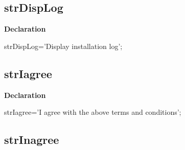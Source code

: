 \documentclass{report}
\newif\ifpdf
\begin{document}
\subsection*{strDispLog}
\fi
\label{trstrings-strDispLog}
\begin{list}{}{
\setlength{\itemindent}{0cm}
\setlength{\listparindent}{0cm}
\setlength{\leftmargin}{\evensidemargin}
\addtolength{\leftmargin}{\tmplength}
\settowidth{\labelsep}{X}
\addtolength{\leftmargin}{\labelsep}
\setlength{\labelwidth}{\tmplength}
}
\item[\textbf{Declaration}\hfill]
\ifpdf
\begin{flushleft}
\fi
\begin{ttfamily}
strDispLog='Display installation log';\end{ttfamily}

\ifpdf
\end{flushleft}
\fi

\end{list}
\ifpdf
\subsection*{\large{\textbf{strIagree}}\normalsize\hspace{1ex}\hrulefill}
\else
\subsection*{strIagree}
\fi
\label{trstrings-strIagree}
\begin{list}{}{
\setlength{\itemindent}{0cm}
\setlength{\listparindent}{0cm}
\setlength{\leftmargin}{\evensidemargin}
\addtolength{\leftmargin}{\tmplength}
\settowidth{\labelsep}{X}
\addtolength{\leftmargin}{\labelsep}
\setlength{\labelwidth}{\tmplength}
}
\item[\textbf{Declaration}\hfill]
\ifpdf
\begin{flushleft}
\fi
\begin{ttfamily}
strIagree='I agree with the above terms and conditions';\end{ttfamily}

\ifpdf
\end{flushleft}
\fi

\end{list}
\ifpdf
\subsection*{\large{\textbf{strInagree}}\normalsize\hspace{1ex}\hrulefill}
\else
\end{document}
